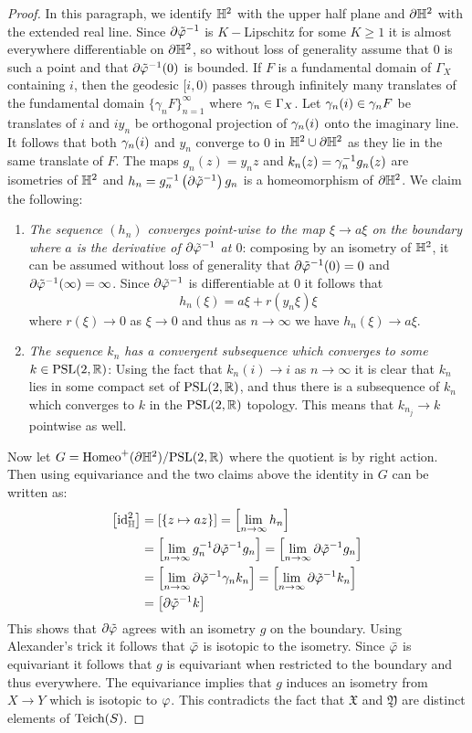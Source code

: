 \begin{proof}
  In this paragraph, we identify $\mathbb{H}^2$ with the upper half plane and ${\partial \mathbb{H}^2}$ with the extended real line. Since $\partial\tilde{\varphi}^{-1}$ is $K-$Lipschitz for some $K\geq 1$ it is almost everywhere differentiable on ${\partial \mathbb{H}^2}$, so without loss of generality assume that $0$ is such a point and that $\partial\tilde{\varphi}^{-1}(0)$ is bounded. If $F$ is a fundamental domain of $\Gamma_X$ containing $i$, then the geodesic $[i,0)$ passes through infinitely many translates of the fundamental domain $\{\gamma_n F\}_{n=1}^\infty$ where $\gamma_n\in \Gamma_X$. Let $\gamma_n (i)\in \gamma_n F$ be translates of $i$ and $iy_n$ be orthogonal projection of $\gamma_n(i)$ onto the imaginary line. It follows that both $\gamma_n(i)$ and $y_n$ converge to $0$ in $\mathbb{H}^2\cup {\partial \mathbb{H}^2}$ as they lie in the same translate of $F$. The maps $g_n(z) = y_n z$ and $k_n(z) = \gamma_n^{-1}g_n(z)$ are isometries of $\mathbb{H}^2$ and $h_n = g_n^{-1} \left(\partial\tilde{\varphi}^{-1}\right) g_n$ is a homeomorphism of ${\partial \mathbb{H}^2}$. We claim the following:
  \begin{enumerate}
    \item \textit{The sequence $(h_n)$ converges point-wise to the map $\xi\to a\xi$ on the boundary where $a$ is the derivative of $\partial\tilde{\varphi}^{-1}$ at $0$}: composing by an isometry of $\mathbb{H}^2$, it can be assumed without loss of generality that $\partial\tilde{\varphi}^{-1}(0) = 0$ and $\partial\tilde{\varphi}^{-1}(\infty) = \infty$. Since $\partial\tilde{\varphi}^{-1}$ is differentiable at $0$ it follows that
      $$h_n(\xi) = a \xi + r(y_n\xi)\xi$$
     where $r(\xi)\to 0$ as $\xi \to 0$ and thus as $n\to \infty$ we have $h_n(\xi) \to a\xi$.
   \item \textit{The sequence $k_n$ has a convergent subsequence which converges to some $k\in \text{PSL}(2,\mathbb{R})$}: Using the fact that $k_n(i)\to i$ as $n\to \infty$ it is clear that $k_n$ lies in some compact set of $\text{PSL}(2,\mathbb{R})$, and thus there is a subsequence of $k_n$ which converges to $k$ in the $\text{PSL}(2,\mathbb{R})$ topology. This means that $k_{n_j}\to k$ pointwise as well.
  \end{enumerate}
  Now let $G = \text{Homeo}^+({\partial \mathbb{H}^2})/\text{PSL}(2,\mathbb{R})$ where the quotient is by right action. Then using equivariance and the two claims above the identity in $G$ can be written as:
  \begin{align*}
    \left[\text{id}_\mathbb{H}^2\right] &= \left[\{z\mapsto az\}\right] = \left[\lim_{n\to \infty} h_n\right]\\ &= \left[\lim_{n\to \infty} g_n^{-1}\partial\tilde{\varphi}^{-1} g_n\right] = \left[\lim_{n\to \infty} \partial\tilde{\varphi}^{-1} g_n\right]\\ &= \left[\lim_{n\to \infty} \partial\tilde{\varphi}^{-1} \gamma_n k_n\right] = \left[\lim_{n\to \infty} \partial\tilde{\varphi}^{-1} k_n\right] \\ &= \left[\partial\tilde{\varphi} ^{-1}k\right]
  \end{align*}
  This shows that $\partial\tilde{\varphi}$ agrees with an isometry $g$ on the boundary. Using Alexander's trick it follows that $\bar{\varphi}$ is isotopic to the isometry. Since $\bar{\varphi}$ is equivariant it follows that $g$ is equivariant when restricted to the boundary and thus everywhere. The equivariance implies that $g$ induces an isometry from $X\to Y$ which is isotopic to $\varphi$. This contradicts the fact that $ \mathfrak{X}$ and $ \mathfrak{Y}$ are distinct elements of $\text{Teich}(S)$.
\end{proof}

